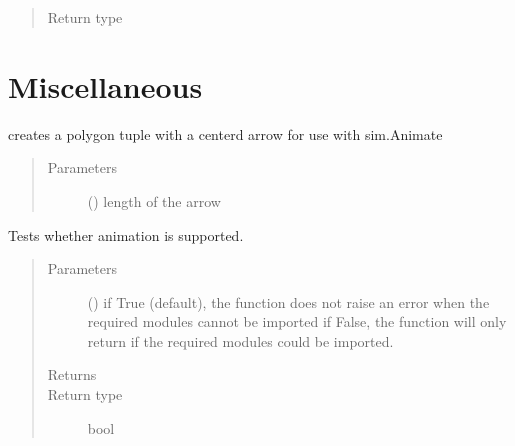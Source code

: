 \documentclass[letterpaper,10pt,english]{sphinxmanual}
\begin{document}
\begin{fulllineitems}
\begin{fulllineitems}
\begin{quote}
\begin{description}
\item[{Return type}] \leavevmode
{\hyperref[\detokenize{Reference:salabim.Queue}]{}}

\end{description}\end{quote}

\end{fulllineitems}


\end{fulllineitems}



\section{Miscellaneous}
\label{\detokenize{Reference:miscellaneous}}

\begin{fulllineitems}
\label{\detokenize{Reference:salabim.arrow_polygon}}
creates a polygon tuple with a centerd arrow for use with sim.Animate
\begin{quote}\begin{description}
\item[{Parameters}] \leavevmode
{} () \textendash{} length of the arrow

\end{description}\end{quote}

\end{fulllineitems}


\begin{fulllineitems}
\label{\detokenize{Reference:salabim.can_animate}}
Tests whether animation is supported.
\begin{quote}\begin{description}
\item[{Parameters}] \leavevmode
{} () \textendash{} if True (default), the function does not raise an error when the required modules cannot be imported 
if False, the function will only return if the required modules could be imported.

\item[{Returns}] \leavevmode
{}

\item[{Return type}] \leavevmode
bool

\end{description}\end{quote}

\end{fulllineitems}
\end{document}
